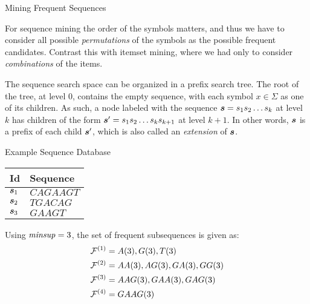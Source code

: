 \begin{frame}{Mining Frequent Sequences}

  For sequence mining the order of the symbols matters, and thus we have
to consider all possible {\em permutations} of the symbols as the
possible frequent candidates. Contrast this with itemset mining, where
we had only to consider {\em combinations} of the items.  

The sequence
search space can be organized in a pref\/{i}x search tree.  The root of the
tree, at level 0, contains the empty sequence, with each symbol $x \in
\Sigma$ as one of its children. As such, a node labeled with the
sequence ${\boldsymbol s}=s_1s_2\ldots s_k$ at level $k$ has children of the form
${\boldsymbol s}' = s_1s_2\ldots s_ks_{k+1}$ at level $k+1$. In other words, ${\boldsymbol s}$
is a pref\/{i}x of each child ${\boldsymbol s}'$, which is also called an {\em
extension} of ${\boldsymbol s}$.

\end{frame}


\begin{frame}{Example Sequence Database}
\begin{center}
\begin{tabular}[h]{|l|l|}
    \hline
    Id & Sequence\\ \hline
    \hline
    ${\boldsymbol s}_1$ & $\mathit{CAGAAGT}$\\
    \hline
    ${\boldsymbol s}_2$ & $\mathit{TGACAG}$\\
    \hline
    ${\boldsymbol s}_3$ & $\mathit{GAAGT}$\\
    \hline
  \end{tabular}
\end{center}

\begin{block}
  
Using $\mathit{minsup}=3$, the set of frequent subsequences is given as:
\begin{align*}
  {\mathcal F}^{(1)} & = A(3), G(3), T(3)\\
  {\mathcal F}^{(2)} & = AA(3), AG(3), GA(3), GG(3)\\
  {\mathcal F}^{(3)} & = AAG(3), GAA(3), GAG(3)\\
  {\mathcal F}^{(4)} & = GAAG(3)
\end{align*}

\end{block}

\end{frame}


\ifdefined\wox \begin{frame} \titlepage \end{frame} \fi


